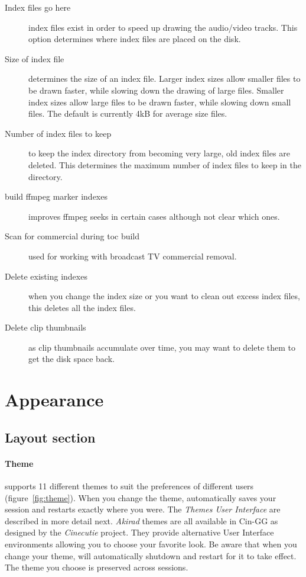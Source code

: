 \begin{description}
    \item[Index files go here] index files exist in order to speed up drawing the audio/video tracks. This option determines where index files are placed on the disk.
    \item[Size of index file] determines the size of an index file. Larger index sizes allow smaller files to be drawn faster, while slowing down the drawing of large files. Smaller index sizes allow large files to be drawn faster, while slowing down small files.  The default is currently 4kB for average size files.
    \item[Number of index files to keep] to keep the index directory from becoming very large, old index files are deleted. This determines the maximum number of index files to keep in the directory.
    \item[build ffmpeg marker indexes] improves ffmpeg seeks in certain cases although not clear which ones.
    \item[Scan for commercial during toc build] used for working with broadcast TV commercial removal.
    \item[Delete existing indexes] when you change the index size or you want to clean out excess index files, this deletes all the index files.
    \item[Delete clip thumbnails] as clip thumbnails accumulate over time, you may want to delete them to get the disk space back.
\end{description}

\section{Appearance}%
\label{sec:appearance}

\subsection{Layout section}%
\label{sub:layout_section}

\paragraph{Theme} \CGG{} supports 11 different themes to suit the preferences of different
users (figure~\ref{fig:theme}).  When you change the theme, \CGG{} automatically saves your
session and restarts exactly where you were.  The \textit{Themes User Interface} are described
in more detail next.  \textit{Akirad} themes are all available in Cin-GG as designed by the
\textit{Cinecutie} project.  They provide alternative User Interface environments allowing
you to choose your favorite look.  Be aware that when you change your theme, \CGG{} will
automatically shutdown and restart for it to take effect.  The theme you choose is preserved
across sessions.

